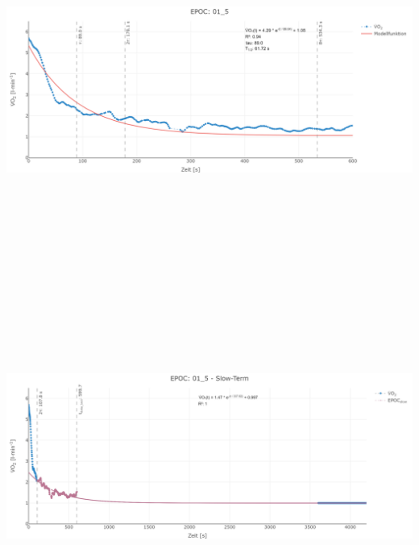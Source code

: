 \documentclass[
  letterpaper,
  DIV=11]{scrartcl}
\begin{document}
\includegraphics[width=11.45833in,height=4.6875in]{images/01_5_tau.png}
\includegraphics[width=11.45833in,height=4.6875in]{images/01_5_slow.png}
\end{document}

